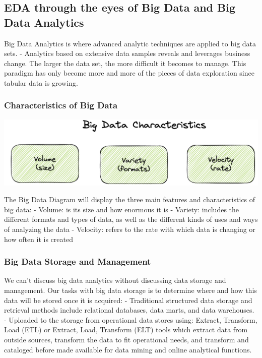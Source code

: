 \documentclass[print]{nuthesis}
\begin{document}
\hypertarget{eda-through-the-eyes-of-big-data-and-big-data-analytics}{%
\subsection{EDA through the eyes of Big Data and Big Data Analytics}\label{eda-through-the-eyes-of-big-data-and-big-data-analytics}}

Big Data Analytics is where advanced analytic techniques are applied to big data sets.
- Analytics based on extensive data samples reveals and leverages business change.
The larger the data set, the more difficult it becomes to manage. This paradigm has only become more and more of the pieces of data exploration since tabular data is growing.

\hypertarget{characteristics-of-big-data}{%
\subsubsection{Characteristics of Big Data}\label{characteristics-of-big-data}}

\begin{center}
\includegraphics[width=\textwidth]{figure/BigDataDiagram}
\end{center}

The Big Data Diagram will display the three main features and characteristics of big data:
- Volume: is its size and how enormous it is
- Variety: includes the different formats and types of data, as well as the different kinds of uses and ways of analyzing the data
- Velocity: refers to the rate with which data is changing or how often it is created

\hypertarget{big-data-storage-and-management}{%
\subsubsection{Big Data Storage and Management}\label{big-data-storage-and-management}}

We can't discuss big data analytics without discussing data storage and management. Our tasks with big data storage is to determine where and how this data will be stored once it is acquired:
- Traditional structured data storage and retrieval methods include relational databases, data marts, and data warehouses.
- Uploaded to the storage from operational data stores using: Extract, Transform, Load (ETL) or Extract, Load, Transform (ELT) tools which extract data from outside sources, transform the data to fit operational needs, and transform and cataloged before made available for data mining and online analytical functions.
\end{document}
